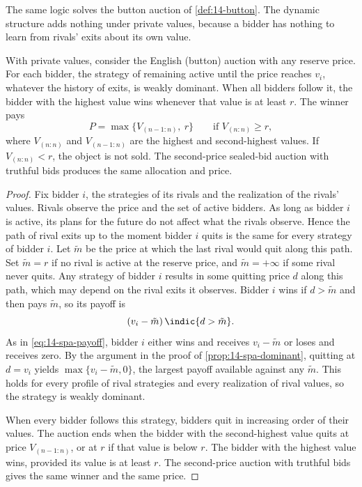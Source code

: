 The same logic solves the button auction of \cref{def:14-button}. The dynamic structure adds nothing under
private values, because a bidder has nothing to learn from rivals' exits about its own value.

\begin{proposition}\label{prop:14-english-dominant}
With private values, consider the English (button) auction with any reserve price. For each bidder, the
strategy of remaining active until the price reaches $v_i$, whatever the history of exits, is weakly
dominant. When all bidders follow it, the bidder with the highest value wins whenever that value is at
least $r$. The winner pays
\begin{equation}\label{eq:14-english-price}
P=\max\bigl\{V_{(n-1:n)},\ r\bigr\}\qquad\text{if }V_{(n:n)}\ge r,
\end{equation}
where $V_{(n:n)}$ and $V_{(n-1:n)}$ are the highest and second-highest values. If $V_{(n:n)}<r$, the object
is not sold. The second-price sealed-bid auction with truthful bids produces the same allocation and price.
\end{proposition}

\begin{proof}
Fix bidder $i$, the strategies of its rivals and the realization of the rivals' values. Rivals observe the
price and the set of active bidders. As long as bidder $i$ is active, its plans for the future do not affect
what the rivals observe. Hence the path of rival exits up to the moment bidder $i$ quits is the same for
every strategy of bidder $i$. Let $\tilde m$ be the price at which the last rival would quit along this
path. Set $\tilde m=r$ if no rival is active at the reserve price, and $\tilde m=+\infty$ if some rival never
quits. Any strategy of bidder $i$ results in some quitting price $d$ along this path, which may depend on the
rival exits it observes. Bidder $i$ wins if $d>\tilde m$ and then pays $\tilde m$, so its payoff is
\[
(v_i-\tilde m)\,\indic\{d>\tilde m\}.
\]
As in \eqref{eq:14-spa-payoff}, bidder $i$ either wins and receives $v_i-\tilde m$ or loses and receives
zero. By the argument in the proof of \cref{prop:14-spa-dominant},
quitting at $d=v_i$ yields $\max\{v_i-\tilde m,0\}$, the largest payoff available against any $\tilde m$.
This holds for every profile of rival strategies and every realization of rival values, so the strategy is
weakly dominant.

When every bidder follows this strategy, bidders quit in increasing order of their values. The auction
ends when the bidder with the second-highest value quits at price $V_{(n-1:n)}$, or at $r$ if that value is
below $r$. The bidder with the highest value wins, provided its value is at least $r$. The second-price
auction with truthful bids gives the same winner and the same price.
\end{proof}

